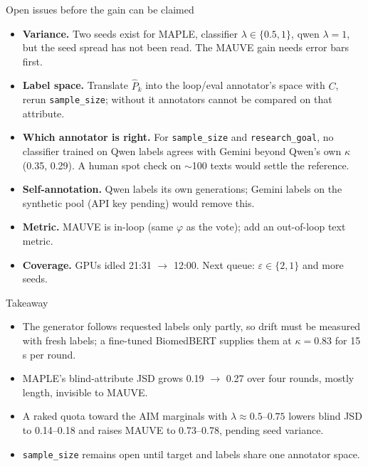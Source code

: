 \documentclass[11pt,aspectratio=169]{beamer}
\newcommand{\Phat}{\hat P}
\begin{document}
\begin{frame}{Open issues before the gain can be claimed}
\begin{itemize}
  \item \textbf{Variance.} Two seeds exist for MAPLE, classifier $\lambda \in \{0.5, 1\}$, qwen $\lambda{=}1$, but the seed spread has not been read. The MAUVE gain needs error bars first.
  \item \textbf{Label space.} Translate $\Phat_k$ into the loop/eval annotator's space with $C$, rerun \texttt{sample\_size}; without it annotators cannot be compared on that attribute.
  \item \textbf{Which annotator is right.} For \texttt{sample\_size} and \texttt{research\_goal}, no classifier trained on Qwen labels agrees with Gemini beyond Qwen's own $\kappa$ (0.35, 0.29). A human spot check on $\sim$100 texts would settle the reference.
  \item \textbf{Self-annotation.} Qwen labels its own generations; Gemini labels on the synthetic pool (API key pending) would remove this.
  \item \textbf{Metric.} MAUVE is in-loop (same $\varphi$ as the vote); add an out-of-loop text metric.
  \item \textbf{Coverage.} GPUs idled 21:31 $\to$ 12:00. Next queue: $\varepsilon \in \{2, 1\}$ and more seeds.
\end{itemize}
\end{frame}

\begin{frame}{Takeaway}
\begin{itemize}
  \item The generator follows requested labels only partly, so drift must be measured with fresh labels; a fine-tuned BiomedBERT supplies them at $\kappa = 0.83$ for 15\,s per round.
  \item MAPLE's blind-attribute JSD grows 0.19 $\to$ 0.27 over four rounds, mostly length, invisible to MAUVE.
  \item A raked quota toward the AIM marginals with $\lambda \approx 0.5$--$0.75$ lowers blind JSD to 0.14--0.18 and raises MAUVE to 0.73--0.78, pending seed variance.
  \item \texttt{sample\_size} remains open until target and labels share one annotator space.
\end{itemize}
\end{frame}
\end{document}
